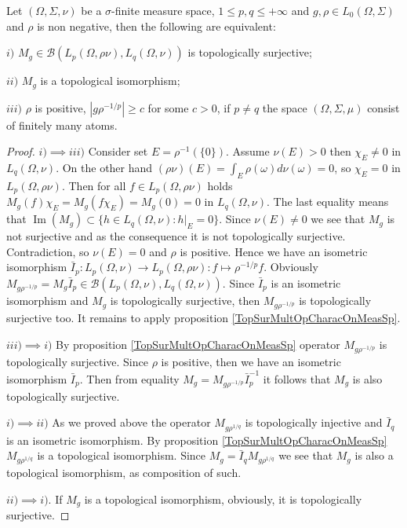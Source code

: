 \begin{proposition}\label{TopSurMultOpCharacBtwnTwoContMeasSp} Let $(\Omega,\Sigma,\nu)$ be a $\sigma$-finite measure space, $1\leq p,q\leq +\infty$ and $g,\rho\in L_0(\Omega,\Sigma)$ and $\rho$ is non negative, then the following are equivalent:

$i)$ $M_g\in\mathcal{B}(L_p(\Omega,\rho \nu),L_q(\Omega,\nu))$ is topologically surjective;

$ii)$ $M_g$ is a topological isomorphism;

$iii)$ $\rho$ is positive, $|g  \rho^{-1/p}|\geq c$ for some $c>0$, if $p\neq q$ the space $(\Omega,\Sigma,\mu)$ consist of finitely many atoms.
\end{proposition}
\begin{proof} $i)$$\implies$$ iii)$ Consider set $E=\rho^{-1}(\{0\})$. Assume $\nu(E)>0$ then $\chi_E\neq 0$ in $L_q(\Omega,\nu)$. On the other hand $(\rho \nu)(E)=\int_E\rho(\omega)d\nu(\omega)=0$, so $\chi_E=0$ in $L_p(\Omega,\rho \nu)$. Then for all $f\in L_p(\Omega,\rho \nu)$ holds $M_g(f)\chi_E=M_g(f \chi_E)=M_g(0)=0$ in $L_q(\Omega,\nu)$. The last equality means that $\operatorname{Im}(M_g)\subset\{h\in L_q(\Omega,\nu): h|_E=0\}$. Since $\nu(E)\neq 0$ we see that $M_g$ is not surjective and as the consequence it is not topologically surjective. Contradiction, so $\nu(E)=0$ and $\rho$ is positive. Hence we have an isometric isomorphism $\bar{I}_p:L_p(\Omega,\nu)\to L_p(\Omega,\rho \nu):f\mapsto \rho^{-1/p}  f$. Obviously $M_{g \rho^{-1/p}}=M_g \bar{I}_p\in\mathcal{B}(L_p(\Omega,\nu),L_q(\Omega,\nu))$. Since $\bar{I}_p$ is an isometric isomorphism and $M_g$ is topologically surjective, then $M_{g  \rho^{-1/p}}$ is topologically surjective too. It remains to apply proposition \ref{TopSurMultOpCharacOnMeasSp}.

$iii)$$\implies$$ i)$ By proposition \ref{TopSurMultOpCharacOnMeasSp} operator $M_{g \rho^{-1/p}}$ is topologically surjective. Since $\rho$ is positive, then we have an isometric isomorphism $\bar{I}_p$. Then from equality $M_g= M_{g \rho^{-1/p}}\bar{I}_p^{-1}$ it follows that $M_g$ is also topologically surjective.

$i)$$\implies$$ ii)$ As we proved above the operator $M_{g \rho^{1/q}}$ is topologically injective and $\bar{I}_q$ is an isometric isomorphism. By proposition \ref{TopSurMultOpCharacOnMeasSp} $M_{g \rho^{1/q}}$ is a topological isomorphism. Since $M_g=\bar{I}_q M_{g \rho^{1/q}}$ we see that $M_g$ is also a topological isomorphism, as composition of such.

$ii)$$\implies$$ i)$. If $M_g$ is a topological isomorphism, obviously, it is topologically surjective.
\end{proof}

